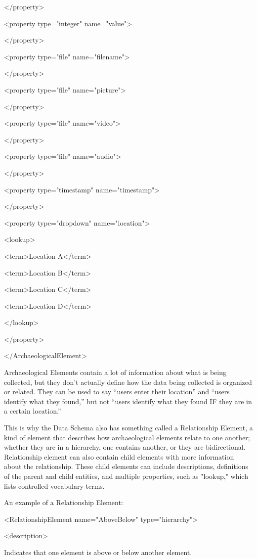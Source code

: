 </property>

<property type="integer" name="value">

</property>

<property type="file" name="filename">

</property>

<property type="file" name="picture">

</property>

<property type="file" name="video">

</property>

<property type="file" name="audio">

</property>

<property type="timestamp" name="timestamp">

</property>

<property type="dropdown" name="location">

<lookup>

<term>Location A</term>

<term>Location B</term>

<term>Location C</term>

<term>Location D</term>

</lookup>

</property>

</ArchaeologicalElement>

Archaeological Elements contain a lot of information about what is being collected, but they don't actually define how the data being collected is organized or related. They can be used to say “users enter their location” and “users identify what they found,” but not “users identify what they found IF they are in a certain location.”

This is why the Data Schema also has something called a Relationship Element, a kind of element that describes how archaeological elements relate to one another; whether they are in a hierarchy, one contains another, or they are bidirectional. Relationship element can also contain child elements with more information about the relationship. These child elements can include descriptions, definitions of the parent and child entities, and multiple properties, such as "lookup," which lists controlled vocabulary terms.

An example of a Relationship Element:

<RelationshipElement name="AboveBelow" type="hierarchy">

<description>

Indicates that one element is above or below another element.

